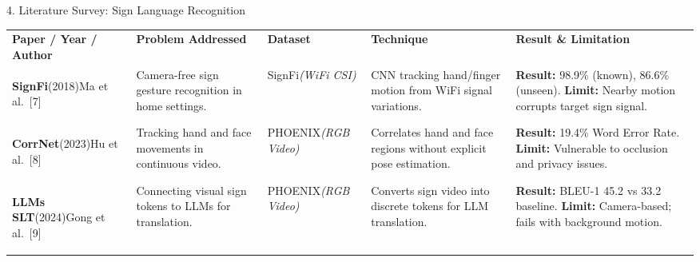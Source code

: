 \documentclass[aspectratio=169,11pt]{beamer}
\begin{document}
\begin{frame}[t]{4. Literature Survey: Sign Language Recognition}

\vspace{-0.1cm} %
\centering
\fontsize{5.5}{6.5}\selectfont
\renewcommand{\arraystretch}{1.05} %
\setlength{\tabcolsep}{3pt}

\begin{tabular}{
>{\bfseries\RaggedRight\arraybackslash}m{}
>{\RaggedRight\arraybackslash}m{}
>{\RaggedRight\arraybackslash}m{}
>{\RaggedRight\arraybackslash}m{}
>{\RaggedRight\arraybackslash}m{} %
}

\rowcolor{AmritaMaroon}
{\color{white}\textbf{Paper / Year / Author}} &
{\color{white}\textbf{Problem Addressed}} &
{\color{white}\textbf{Dataset}} &
{\color{white}\textbf{Technique}} &
{\color{white}\textbf{Result \& Limitation}} \\

\arrayrulecolor{white}\hline

\rowcolor{LightBlue}
\textbf{SignFi}\newline \textnormal{(2018)}\newline \textnormal{Ma et al.~[7]} &
Camera-free sign gesture recognition in home settings. &
SignFi\newline\textit{(WiFi CSI)} &
CNN tracking hand/finger motion from WiFi signal variations. &
\textbf{Result:} 98.9\% (known), 86.6\% (unseen).\newline
\textbf{Limit:} Nearby motion corrupts target sign signal. \\

\hline

\rowcolor{LightGreen}
\textbf{CorrNet}\newline \textnormal{(2023)}\newline \textnormal{Hu et al.~[8]} &
Tracking hand and face movements in continuous video. &
PHOENIX\newline\textit{(RGB Video)} &
Correlates hand and face regions without explicit pose estimation. &
\textbf{Result:} 19.4\% Word Error Rate.\newline
\textbf{Limit:} Vulnerable to occlusion and privacy issues. \\

\hline

\rowcolor{LightCyan}
\textbf{LLMs SLT}\newline \textnormal{(2024)}\newline \textnormal{Gong et al.~[9]} &
Connecting visual sign tokens to LLMs for translation. &
PHOENIX\newline\textit{(RGB Video)} &
Converts sign video into discrete tokens for LLM translation. &
\textbf{Result:} BLEU-1 45.2 vs 33.2 baseline.\newline
\textbf{Limit:} Camera-based; fails with background motion. \\


\end{tabular}
\end{frame}
\end{document}
